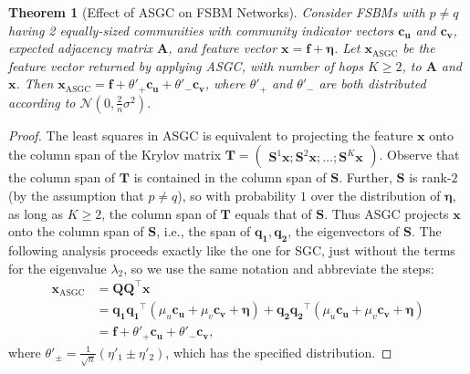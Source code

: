\documentclass{article}
\newcommand{\tp}{{\scriptscriptstyle +}}
\newcommand{\tm}{{\scriptscriptstyle -}}
\newtheorem{theorem}{Theorem}
\newcommand{\Cam}[1]{\textcolor{blue}{Cam: #1}}
\begin{document}
\begin{theorem}[Effect of ASGC on FSBM Networks]
Consider FSBMs with $p \neq q$ having 2 equally-sized communities with community indicator vectors $\bm{c_u}$ and $\bm{c_v}$, expected adjacency matrix $\bm{A}$, and feature vector $\bm{x} = \bm{f} + \bm{\eta}$. Let $\bm{x}_\text{ASGC}$ be the feature vector returned by applying ASGC, with number of hops $K \geq 2$, to $\bm{A}$ and $\bm{x}$. Then $\bm{x}_\text{ASGC} = \bm{f} + \theta'_\tp \bm{c_u} + \theta'_\tm \bm{c_v}$, where $\theta'_\tp$ and $\theta'_\tm$ are both distributed according to $\mathcal{N}\left( 0, \tfrac{2}{n} \sigma^2 \right)$.
\end{theorem}
%
\begin{proof}
The least squares in ASGC is equivalent to projecting the feature $\bm{x}$ onto the column span of the Krylov matrix $\bm{T} = \begin{pmatrix} \bm{S}^1 \bm{x} ; \bm{S}^2 \bm{x} ; \dots ; \bm{S}^K \bm{x} \end{pmatrix}$. 
Observe that the column span of $\bm T$ is contained in the column span of $\bm{S}$. Further, $\bm{S}$ is rank-$2$ (by the assumption that $p \neq q$), so with probability $1$ over the distribution of $\bm{\eta}$, as long as $K \ge 2$, the column span of $\bm{T}$ equals that of $\bm{S}$. Thus ASGC projects $\bm{x}$ onto the column span of $\bm{S}$, i.e., the span of $\bm{q_1},\bm{q_2}$, the eigenvectors of $\bm{S}$. The following analysis proceeds exactly like the one for SGC, just without the terms for the eigenvalue $\lambda_2$, so we use the same notation and abbreviate the steps:
%
\begin{align*}
    \bm{x}_\text{ASGC} &= \bm{Q}\bm{Q}^\top \bm{x} \\
    &= \bm{q_1} \bm{q_1}^\top ( \mu_u \bm{c_u} + \mu_v \bm{c_v} + \bm{\eta} ) + \bm{q_2} \bm{q_2}^\top ( \mu_u \bm{c_u} + \mu_v \bm{c_v} + \bm{\eta} ) \\
    &= \bm{f} + \theta'_\tp \bm{c_u} + \theta'_\tm \bm{c_v},
\end{align*}
where $\theta'_\pm = \tfrac{1}{\sqrt{n}} ( \eta'_1 \pm \eta'_2 )$, which has the specified distribution.
\end{proof}
\end{document}
